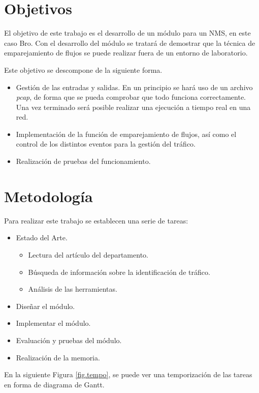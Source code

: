 \section{Objetivos}

El objetivo de este trabajo es el desarrollo de un módulo para un NMS, en este caso Bro. Con el desarrollo del módulo se tratará 
de demostrar que la técnica de emparejamiento de flujos se puede realizar fuera de un entorno de laboratorio.

\intro Este objetivo se descompone de la siguiente forma.

\begin{itemize}
\item Gestión de las entradas y salidas. En un principio se hará uso de un archivo \textit{pcap}, de forma 
que se pueda comprobar que todo funciona correctamente. Una vez terminado será posible realizar una ejecución a tiempo real en una 
red.
\item Implementación de la función de emparejamiento de flujos, así como el control de los distintos eventos para la gestión del 
tráfico.
\item Realización de pruebas del funcionamiento.
\end{itemize}

\section{Metodología}

Para realizar este trabajo se establecen una serie de tareas:

\begin{itemize}
\item Estado del Arte.
	\begin{itemize}
	\item Lectura del artículo del departamento. \cite{comparacion}
	\item Búsqueda de información sobre la identificación de tráfico.
	\item Análisis de las herramientas.
	\end{itemize}
\item Diseñar el módulo.
\item Implementar el módulo.
\item Evaluación y pruebas del módulo.
\item Realización de la memoria.
\end{itemize}

\intro En la siguiente Figura \ref{fig.tempo}, se puede ver una temporización de las tareas en forma de diagrama de Gantt.

